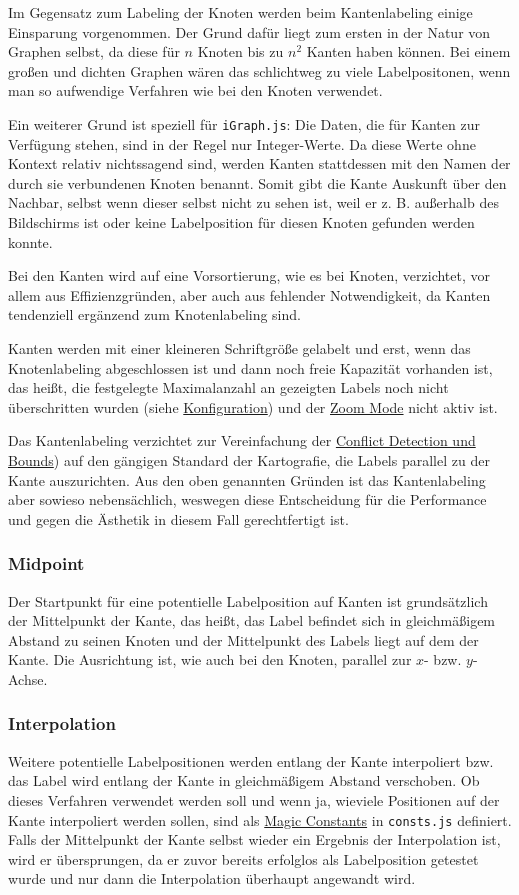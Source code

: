 Im Gegensatz zum Labeling der Knoten werden beim Kantenlabeling einige Einsparung vorgenommen.
Der Grund dafür liegt zum ersten in der Natur von Graphen selbst, da diese für $n$ Knoten bis zu $n^2$ Kanten haben können.
Bei einem großen und dichten Graphen wären das schlichtweg zu viele Labelpositonen, wenn man so aufwendige Verfahren wie bei den Knoten verwendet.

Ein weiterer Grund ist speziell für \texttt{iGraph.js}: Die Daten, die für Kanten zur Verfügung stehen, sind in der Regel nur Integer-Werte.
Da diese Werte ohne Kontext relativ nichtssagend sind, werden Kanten stattdessen mit den Namen der durch sie verbundenen Knoten benannt.
Somit gibt die Kante Auskunft über den Nachbar, selbst wenn dieser selbst nicht zu sehen ist, weil er z. B. außerhalb des Bildschirms ist oder
keine Labelposition für diesen Knoten gefunden werden konnte.

Bei den Kanten wird auf eine Vorsortierung, wie es bei Knoten, verzichtet, vor allem aus Effizienzgründen, aber auch aus fehlender Notwendigkeit, da Kanten tendenziell ergänzend zum Knotenlabeling sind.

Kanten werden mit einer kleineren Schriftgröße gelabelt und erst, wenn das Knotenlabeling abgeschlossen ist und dann noch freie Kapazität vorhanden ist,
das heißt, die festgelegte Maximalanzahl an gezeigten Labels noch nicht überschritten wurden (siehe \hyperref[sec:configuration]{Konfiguration})
und der \hyperref[subsec:zoom]{Zoom Mode} nicht aktiv ist.

Das Kantenlabeling verzichtet zur Vereinfachung der \hyperref[sec:conflict]{Conflict Detection und Bounds}) auf den gängigen Standard der Kartografie, die Labels
parallel zu der Kante auszurichten.
Aus den oben genannten Gründen ist das Kantenlabeling aber sowieso nebensächlich, weswegen diese Entscheidung für die Performance
und gegen die Ästhetik in diesem Fall gerechtfertigt ist.

\subsubsection{Midpoint}
Der Startpunkt für eine potentielle Labelposition auf Kanten ist grundsätzlich der Mittelpunkt der Kante, das heißt, das Label befindet sich in
gleichmäßigem Abstand zu seinen Knoten und der Mittelpunkt des Labels liegt auf dem der Kante. Die Ausrichtung ist, wie auch bei den Knoten, parallel zur $x$- bzw. $y$-Achse.

\subsubsection{Interpolation}
Weitere potentielle Labelpositionen werden entlang der Kante interpoliert bzw. das Label wird entlang der Kante in gleichmäßigem Abstand verschoben.
Ob dieses Verfahren verwendet werden soll und wenn ja, wieviele Positionen auf der Kante interpoliert werden sollen, sind als \hyperref[subsec:consts]{Magic Constants} in \texttt{consts.js} definiert.
Falls der Mittelpunkt der Kante selbst wieder ein Ergebnis der Interpolation ist, wird er übersprungen, da er zuvor bereits erfolglos als Labelposition getestet wurde und nur dann die Interpolation überhaupt angewandt wird.